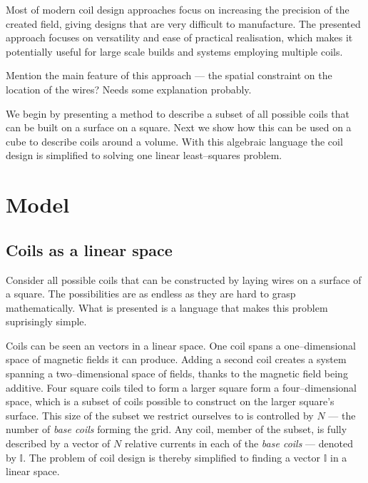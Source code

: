 Most of modern coil design approaches focus on increasing the precision of the created field, giving designs that are very difficult to manufacture. The presented approach focuses on versatility and ease of practical realisation, which makes it potentially useful for large scale builds and systems employing multiple coils.

Mention the main feature of this approach --- the spatial constraint on the location of the wires? Needs some explanation probably.

We begin by presenting a method to describe a subset of all possible coils that can be built on a surface on a square. Next we show how this can be used on a cube to describe coils around a volume. With this algebraic language the coil design is simplified to solving one linear least--squares problem.


\section{Model}
\subsection{Coils as a linear space}
Consider all possible coils that can be constructed by laying wires on a surface of a square. The possibilities are as endless as they are hard to grasp mathematically. What is presented is a language that makes this problem suprisingly simple.

Coils can be seen an vectors in a linear space. One coil spans a one--dimensional space of magnetic fields it can produce. Adding a second coil creates a system spanning a two--dimensional space of fields, thanks to the magnetic field being additive. Four square coils tiled to form a larger square form a four--dimensional space, which is a subset of coils possible to construct on the larger square's surface. This size of the subset we restrict ourselves to is controlled by $N$ --- the number of \emph{base coils} forming the grid. Any coil, member of the subset, is fully described by a vector of $N$ relative currents in each of the \emph{base coils} --- denoted by $\mathbb{I}$. The problem of coil design is thereby simplified to finding a vector $\mathbb{I}$ in a linear space.

